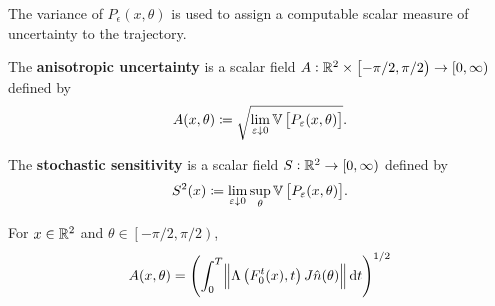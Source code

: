 The variance of \(P_\epsilon\left(x,\theta\right)\) is used to assign a computable scalar measure of uncertainty to the trajectory.

\begin{defn}
	\begin{alpharate}
		\item The \textbf{anisotropic uncertainty} is a scalar field \(A: \mathbb{R}^2\times\left[-\pi/2, \pi/2\right) \to [0,\infty)\) defined by
		\[
			A(x,\theta) \coloneqq \sqrt{\lim_{\varepsilon\downarrow 0}\mathbb{V}\left[P_\varepsilon(x,\theta)\right]}.
		\]

		\item The \textbf{stochastic sensitivity} is a scalar field \(S: \mathbb{R}^2 \to [0,\infty)\) defined by
		\[
			S^2(x) \coloneqq \lim_{\varepsilon\downarrow 0}\sup_{\theta}{\mathbb{V}\left[P_\varepsilon(x,\theta)\right]}.
		\]
	\end{alpharate}


	\begin{theorem}
		For \(x \in \mathbb{R}^2\) and \(\theta \in \left[-\pi/2, \pi/2\right)\),
		\[
			A(x,\theta) = \left(\int_0^T{\norm{\Lambda\left(F_0^t(x), t\right)J\hat{n}(\theta)}\dif t}\right)^{1/2}
		\]
	\end{theorem}



\end{defn}


